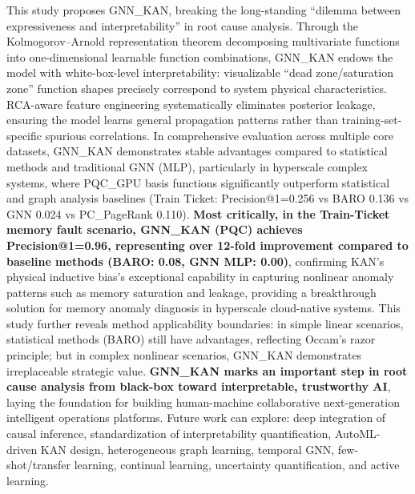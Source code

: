 \documentclass[conference]{IEEEtran}
\begin{document}
This study proposes GNN\_KAN, breaking the long-standing ``dilemma between expressiveness and interpretability'' in root cause analysis. Through the Kolmogorov--Arnold representation theorem decomposing multivariate functions into one-dimensional learnable function combinations, GNN\_KAN endows the model with white-box-level interpretability: visualizable ``dead zone/saturation zone'' function shapes precisely correspond to system physical characteristics. RCA-aware feature engineering systematically eliminates posterior leakage, ensuring the model learns general propagation patterns rather than training-set-specific spurious correlations. In comprehensive evaluation across multiple core datasets, GNN\_KAN demonstrates stable advantages compared to statistical methods and traditional GNN (MLP), particularly in hyperscale complex systems, where PQC\_GPU basis functions significantly outperform statistical and graph analysis baselines (Train Ticket: Precision@1=0.256 vs BARO 0.136 vs GNN 0.024 vs PC\_PageRank 0.110). \textbf{Most critically, in the Train-Ticket memory fault scenario, GNN\_KAN (PQC) achieves Precision@1=0.96, representing over 12-fold improvement compared to baseline methods (BARO: 0.08, GNN MLP: 0.00)}, confirming KAN's physical inductive bias's exceptional capability in capturing nonlinear anomaly patterns such as memory saturation and leakage, providing a breakthrough solution for memory anomaly diagnosis in hyperscale cloud-native systems. This study further reveals method applicability boundaries: in simple linear scenarios, statistical methods (BARO) still have advantages, reflecting Occam's razor principle; but in complex nonlinear scenarios, GNN\_KAN demonstrates irreplaceable strategic value. \textbf{GNN\_KAN marks an important step in root cause analysis from black-box toward interpretable, trustworthy AI}, laying the foundation for building human-machine collaborative next-generation intelligent operations platforms. Future work can explore: deep integration of causal inference, standardization of interpretability quantification, AutoML-driven KAN design, heterogeneous graph learning, temporal GNN, few-shot/transfer learning, continual learning, uncertainty quantification, and active learning.
\end{document}
